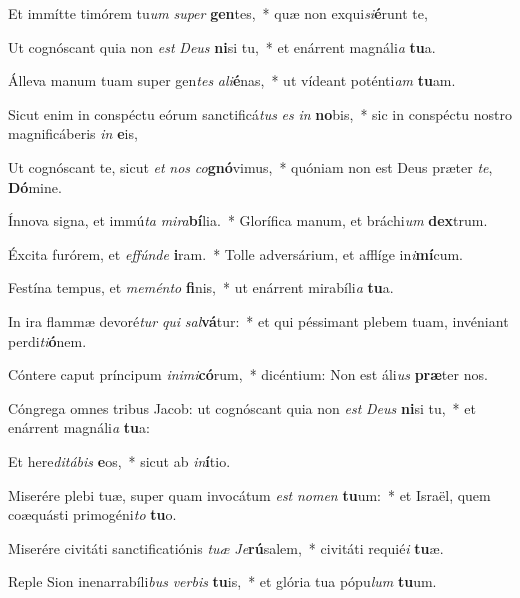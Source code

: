 \item Et immítte timórem tu\textit{um} \textit{su}\textit{per} \textbf{gen}tes,~* quæ non exqui\textit{si}\textbf{é}runt te,
\item Ut cognóscant quia non \textit{est} \textit{De}\textit{us} \textbf{ni}si tu,~* et enárrent magnáli\textit{a} \textbf{tu}a.
\item Álleva manum tuam super gen\textit{tes} \textit{a}\textit{li}\textbf{é}nas,~* ut vídeant poténti\textit{am} \textbf{tu}am.
\item Sicut enim in conspéctu eórum sanctificá\textit{tus} \textit{es} \textit{in} \textbf{no}bis,~* sic in conspéctu nostro magnificáberis \textit{in} \textbf{e}is,
\item Ut cognóscant te, sicut \textit{et} \textit{nos} \textit{co}\textbf{gnó}vimus,~* quóniam non est Deus præter \textit{te}, \textbf{Dó}mine.
\item Ínnova signa, et immú\textit{ta} \textit{mi}\textit{ra}\textbf{bí}lia.~* Glorífica manum, et bráchi\textit{um} \textbf{dex}trum.
\item Éxcita furórem, et \textit{ef}\textit{fún}\textit{de} \textbf{i}ram.~* Tolle adversárium, et afflíge in\textit{i}\textbf{mí}cum.
\item Festína tempus, et \textit{me}\textit{mén}\textit{to} \textbf{fi}nis,~* ut enárrent mirabíli\textit{a} \textbf{tu}a.
\item In ira flammæ devoré\textit{tur} \textit{qui} \textit{sal}\textbf{vá}tur:~* et qui péssimant plebem tuam, invéniant perdi\textit{ti}\textbf{ó}nem.
\item Cóntere caput príncipum \textit{in}\textit{i}\textit{mi}\textbf{có}rum,~* dicéntium: Non est áli\textit{us} \textbf{præ}ter nos.
\item Cóngrega omnes tribus Jacob: ut cognóscant quia non \textit{est} \textit{De}\textit{us} \textbf{ni}si tu,~* et enárrent magnáli\textit{a} \textbf{tu}a:
\item Et here\textit{di}\textit{tá}\textit{bis} \textbf{e}os,~* sicut ab \textit{in}\textbf{í}tio.
\item Miserére plebi tuæ, super quam invocátum \textit{est} \textit{no}\textit{men} \textbf{tu}um:~* et Israël, quem coæquásti primogéni\textit{to} \textbf{tu}o.
\item Miserére civitáti sanctificatiónis \textit{tu}\textit{æ} \textit{Je}\textbf{rú}salem,~* civitáti requié\textit{i} \textbf{tu}æ.
\item Reple Sion inenarrabíli\textit{bus} \textit{ver}\textit{bis} \textbf{tu}is,~* et glória tua pópu\textit{lum} \textbf{tu}um.
